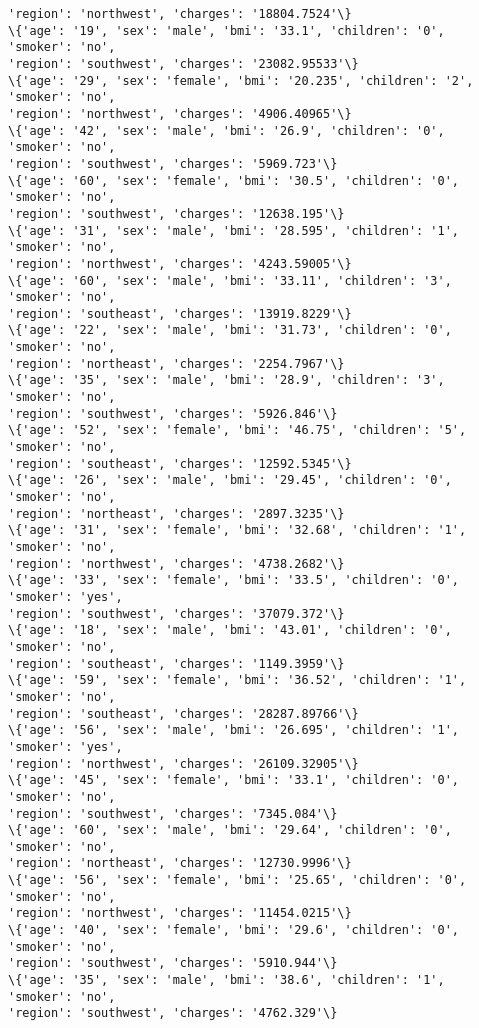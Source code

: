 \documentclass[11pt]{article}
\begin{document}
\begin{Verbatim}[commandchars=\\\{\}]
'region': 'northwest', 'charges': '18804.7524'\}
\{'age': '19', 'sex': 'male', 'bmi': '33.1', 'children': '0', 'smoker': 'no',
'region': 'southwest', 'charges': '23082.95533'\}
\{'age': '29', 'sex': 'female', 'bmi': '20.235', 'children': '2', 'smoker': 'no',
'region': 'northwest', 'charges': '4906.40965'\}
\{'age': '42', 'sex': 'male', 'bmi': '26.9', 'children': '0', 'smoker': 'no',
'region': 'southwest', 'charges': '5969.723'\}
\{'age': '60', 'sex': 'female', 'bmi': '30.5', 'children': '0', 'smoker': 'no',
'region': 'southwest', 'charges': '12638.195'\}
\{'age': '31', 'sex': 'male', 'bmi': '28.595', 'children': '1', 'smoker': 'no',
'region': 'northwest', 'charges': '4243.59005'\}
\{'age': '60', 'sex': 'male', 'bmi': '33.11', 'children': '3', 'smoker': 'no',
'region': 'southeast', 'charges': '13919.8229'\}
\{'age': '22', 'sex': 'male', 'bmi': '31.73', 'children': '0', 'smoker': 'no',
'region': 'northeast', 'charges': '2254.7967'\}
\{'age': '35', 'sex': 'male', 'bmi': '28.9', 'children': '3', 'smoker': 'no',
'region': 'southwest', 'charges': '5926.846'\}
\{'age': '52', 'sex': 'female', 'bmi': '46.75', 'children': '5', 'smoker': 'no',
'region': 'southeast', 'charges': '12592.5345'\}
\{'age': '26', 'sex': 'male', 'bmi': '29.45', 'children': '0', 'smoker': 'no',
'region': 'northeast', 'charges': '2897.3235'\}
\{'age': '31', 'sex': 'female', 'bmi': '32.68', 'children': '1', 'smoker': 'no',
'region': 'northwest', 'charges': '4738.2682'\}
\{'age': '33', 'sex': 'female', 'bmi': '33.5', 'children': '0', 'smoker': 'yes',
'region': 'southwest', 'charges': '37079.372'\}
\{'age': '18', 'sex': 'male', 'bmi': '43.01', 'children': '0', 'smoker': 'no',
'region': 'southeast', 'charges': '1149.3959'\}
\{'age': '59', 'sex': 'female', 'bmi': '36.52', 'children': '1', 'smoker': 'no',
'region': 'southeast', 'charges': '28287.89766'\}
\{'age': '56', 'sex': 'male', 'bmi': '26.695', 'children': '1', 'smoker': 'yes',
'region': 'northwest', 'charges': '26109.32905'\}
\{'age': '45', 'sex': 'female', 'bmi': '33.1', 'children': '0', 'smoker': 'no',
'region': 'southwest', 'charges': '7345.084'\}
\{'age': '60', 'sex': 'male', 'bmi': '29.64', 'children': '0', 'smoker': 'no',
'region': 'northeast', 'charges': '12730.9996'\}
\{'age': '56', 'sex': 'female', 'bmi': '25.65', 'children': '0', 'smoker': 'no',
'region': 'northwest', 'charges': '11454.0215'\}
\{'age': '40', 'sex': 'female', 'bmi': '29.6', 'children': '0', 'smoker': 'no',
'region': 'southwest', 'charges': '5910.944'\}
\{'age': '35', 'sex': 'male', 'bmi': '38.6', 'children': '1', 'smoker': 'no',
'region': 'southwest', 'charges': '4762.329'\}

\end{Verbatim}
\end{document}
